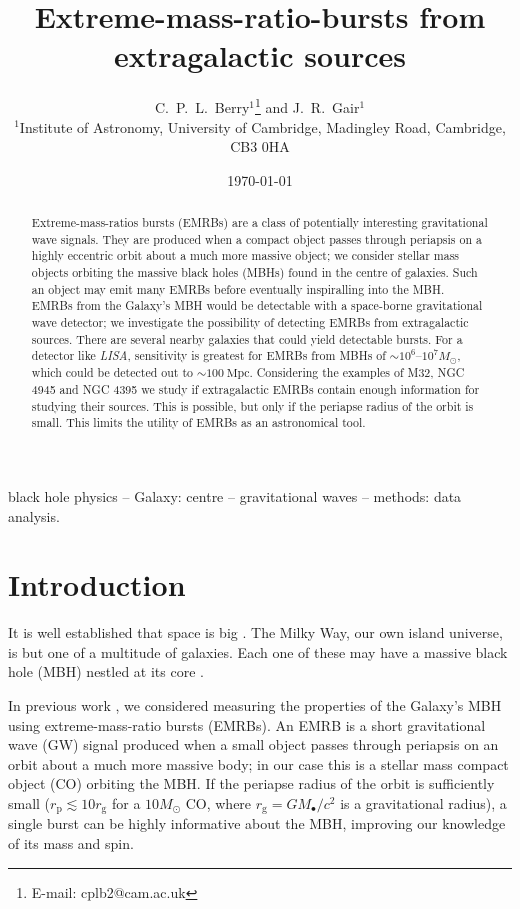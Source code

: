 \documentclass[useAMS,usedcolumn,usegraphicx,usenatbib]{mn2e}
\title[EMRBs from extragalactic sources]{Extreme-mass-ratio-bursts from extragalactic sources}
\author[C.\ P.\ L.\ Berry and J.\ R.\ Gair]{C.\ P.\ L.\ Berry$^{1}$\thanks{E-mail: cplb2@cam.ac.uk} and J.\ R.\ Gair$^{1}$\\
$^{1}$Institute of Astronomy, University of Cambridge, Madingley Road, Cambridge, CB3 0HA}
\newcommand{\units}[1]{\ensuremath{~\mathrm{#1}}}
\newcommand{\sub}[1]{\ensuremath{_\mathrm{#1}}}
\begin{document}
\date{\today}

\pagerange{\pageref{firstpage}--\pageref{lastpage}} 

\maketitle

\label{firstpage}

\begin{abstract}
Extreme-mass-ratios bursts (EMRBs) are a class of potentially interesting gravitational wave signals. They are produced when a compact object passes through periapsis on a highly eccentric orbit about a much more massive object; we consider stellar mass objects orbiting the massive black holes (MBHs) found in the centre of galaxies. Such an object may emit many EMRBs before eventually inspiralling into the MBH. EMRBs from the Galaxy's MBH would be detectable with a space-borne gravitational wave detector; we investigate the possibility of detecting EMRBs from extragalactic sources. There are several nearby galaxies that could yield detectable bursts. For a detector like \textit{LISA}, sensitivity is greatest for EMRBs from MBHs of $\sim10^6$--$10^7 M_\odot$, which could be detected out to $\sim 100\units{Mpc}$. Considering the examples of M32, NGC 4945 and NGC 4395 we study if extragalactic EMRBs contain enough information for studying their sources. This is possible, but only if the periapse radius of the orbit is small. This limits the utility of EMRBs as an astronomical tool.

\end{abstract}

\begin{keywords}
black hole physics -- Galaxy: centre -- gravitational waves -- methods: data analysis.
\end{keywords}

\section{Introduction}\label{sec:Intro}

It is well established that space is big \citep[chapter 8]{Adams1979}. The Milky Way, our own island universe, is but one of a multitude of galaxies. Each one of these may have a massive black hole (MBH) nestled at its core \citep{Lynden-Bell1971, Soltan1982}.

In previous work \citep{Berry2013}, we considered measuring the properties of the Galaxy's MBH using extreme-mass-ratio bursts (EMRBs). An EMRB is a short gravitational wave (GW) signal produced when a small object passes through periapsis on an orbit about a much more massive body; in our case this is a stellar mass compact object (CO) orbiting the MBH. If the periapse radius of the orbit is sufficiently small ($r\sub{p} \lesssim 10 r\sub{g}$ for a $10 M_\odot$ CO, where $r\sub{g} = GM_\bullet/c^2$ is a gravitational radius), a single burst can be highly informative about the MBH, improving our knowledge of its mass and spin.
\end{document}
